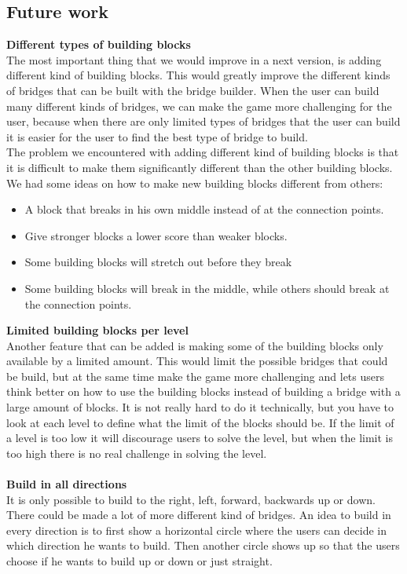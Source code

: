 \subsection{Future work}
\textbf{Different types of building blocks}\\
The most important thing that we would improve in a next version, is adding different kind of building blocks. This would greatly improve the different kinds of bridges that can be built with the bridge builder. When the user can build many different kinds of bridges, we can make the game more challenging for the user, because when there are only limited types of bridges that the user can build it is easier for the user to find the best type of bridge to build. \\
The problem we encountered with adding different kind of building blocks is that it is difficult to make them significantly different than the other building blocks. We had some ideas on how to make new building blocks different from others:\\
\begin{itemize}
\item A block that breaks in his own middle instead of at the connection points.
\item Give stronger blocks a lower score than weaker blocks.
\item Some building blocks will stretch out before they break
\item Some building blocks will break in the middle, while others should break at the connection points.
\end{itemize} 
\textbf{Limited building blocks per level}\\
Another feature that can be added is making some of the building blocks only available by a limited amount. This would limit the possible bridges that could be build, but at the same time make the game more challenging and lets users think better on how to use the building blocks instead of building a bridge with a large amount of blocks.  
It is not really hard to do it technically, but you have to look at each level to define what the limit of the blocks should be. If the limit of a level is too low it will discourage users to solve the level, but when the limit is too high there is no real challenge in solving the level.\\ \\
\textbf{Build in all directions}\\
It is only possible to build to the right, left, forward, backwards up or down. There could be made a lot of more different kind of bridges. An idea to build in every direction is to first show a horizontal circle where the users can decide in which direction he wants to build. Then another circle shows up so that the users choose if he wants to build up or down or just straight. 
